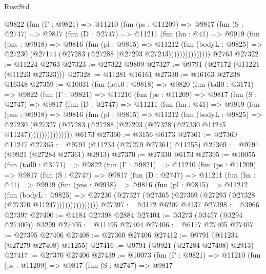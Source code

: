 \begin{lexlean}{RustStd}
\begin{coremodule}
        @9822
          (fun (Γ : @9821) =>
          @11210
            (fun (ps : @11209) =>
            @9817
              (fun (S : @2747) =>
              @9817
                (fun (D : @2747) =>
                @11211
                  (fun (hn : @41) =>
                  @9919
                    (fun (pns : @9918) =>
                    @9816
                      (fun (pl : @9815) =>
                      @11212
                        (fun (bodyL : @9825) =>
                        @27230 (@27174 (@27283 (@27288 (@27293 @27243)))))))))))))))
    @2763
@27322 := @11224 @2763
@27323 := @27322 @9809
@27327 := @9791 (@27172 (@11221 (@11223 @27323)))
@27328 := @11281 @16161
@27330 := @16163 @27238 @16348
@27359 := @10031
    (fun (lets0 : @9818) =>
    @9820
      (fun (tail0 : @3171) =>
      @9822
        (fun (Γ : @9821) =>
        @11210
          (fun (ps : @11209) =>
          @9817
            (fun (S : @2747) =>
            @9817
              (fun (D : @2747) =>
              @11211
                (fun (hn : @41) =>
                @9919
                  (fun (pns : @9918) =>
                  @9816
                    (fun (pl : @9815) =>
                    @11212
                      (fun (bodyL : @9825) =>
                      @27230
                        (@27327
                          (@27283 (@27288 (@27293 (@27328 (@27330 @11245 @11247))))))))))))))))
    @6173
@27360 := @3156 @6173
@27361 := @27360 @11247
@27365 := @9791 (@11234 (@27279 @27361) @11255)
@27369 := @9791 (@9921 (@27284 @27361) @2913)
@27370 := @27330 @6173
@27395 := @10055
    (fun (tail0 : @3171) =>
    @9822
      (fun (Γ : @9821) =>
      @11210
        (fun (ps : @11209) =>
        @9817
          (fun (S : @2747) =>
          @9817
            (fun (D : @2747) =>
            @11211
              (fun (hn : @41) =>
              @9919
                (fun (pns : @9918) =>
                @9816
                  (fun (pl : @9815) =>
                  @11212
                    (fun (bodyL : @9825) =>
                    @27230 (@27327 (@27365 (@27369 (@27293 (@27328 (@27370 @11247)))))))))))))))
@27397 := @3172 @6207 @4137
@27398 := @3966 @27397
@27400 := @4184 @27398 @2884
@27404 := @3273 (@3457 (@3294 @27400)) @3299
@27405 := @11495 @27404
@27406 := @6177 @27405
@27407 := @27395 @27406
@27408 := @27360 @27406
@27412 := @9791 (@11234 (@27279 @27408) @11255)
@27416 := @9791 (@9921 (@27284 @27408) @2913)
@27417 := @27370 @27406
@27439 := @10073
    (fun (Γ : @9821) =>
    @11210
      (fun (ps : @11209) =>
      @9817
        (fun (S : @2747) =>
        @9817

\end{coremodule}
\end{lexlean}
